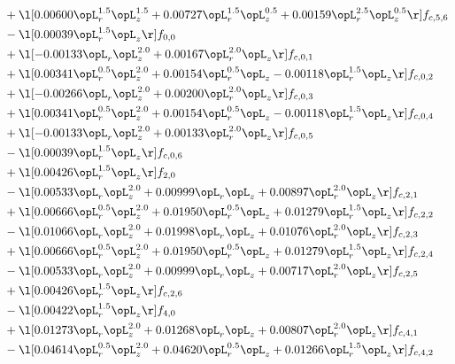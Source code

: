 \begin{alignat}{2}
& + \l[  0.00600 \opL_r^{1.5} \opL_z^{1.5} +  0.00727 \opL_r^{1.5} \opL_z^{0.5} +  0.00159 \opL_r^{2.5} \opL_z^{0.5}  \r] f_{c,5,6} \nonumber \\ 
& - \l[  0.00039 \opL_r^{1.5} \opL_z  \r] f_{0,0} \nonumber \\ 
& + \l[  -0.00133 \opL_r \opL_z^{2.0} +  0.00167 \opL_r^{2.0} \opL_z  \r] f_{c,0,1} \nonumber \\ 
& + \l[  0.00341 \opL_r^{0.5} \opL_z^{2.0} +  0.00154 \opL_r^{0.5} \opL_z   -0.00118 \opL_r^{1.5} \opL_z  \r] f_{c,0,2} \nonumber \\ 
& + \l[  -0.00266 \opL_r \opL_z^{2.0} +  0.00200 \opL_r^{2.0} \opL_z  \r] f_{c,0,3} \nonumber \\ 
& + \l[  0.00341 \opL_r^{0.5} \opL_z^{2.0} +  0.00154 \opL_r^{0.5} \opL_z   -0.00118 \opL_r^{1.5} \opL_z  \r] f_{c,0,4} \nonumber \\ 
& + \l[  -0.00133 \opL_r \opL_z^{2.0} +  0.00133 \opL_r^{2.0} \opL_z  \r] f_{c,0,5} \nonumber \\ 
& - \l[  0.00039 \opL_r^{1.5} \opL_z  \r] f_{c,0,6} \nonumber \\ 
& + \l[  0.00426 \opL_r^{1.5} \opL_z  \r] f_{2,0} \nonumber \\ 
& - \l[  0.00533 \opL_r \opL_z^{2.0} +  0.00999 \opL_r \opL_z +  0.00897 \opL_r^{2.0} \opL_z  \r] f_{c,2,1} \nonumber \\ 
& + \l[  0.00666 \opL_r^{0.5} \opL_z^{2.0} +  0.01950 \opL_r^{0.5} \opL_z +  0.01279 \opL_r^{1.5} \opL_z  \r] f_{c,2,2} \nonumber \\ 
& - \l[  0.01066 \opL_r \opL_z^{2.0} +  0.01998 \opL_r \opL_z +  0.01076 \opL_r^{2.0} \opL_z  \r] f_{c,2,3} \nonumber \\ 
& + \l[  0.00666 \opL_r^{0.5} \opL_z^{2.0} +  0.01950 \opL_r^{0.5} \opL_z +  0.01279 \opL_r^{1.5} \opL_z  \r] f_{c,2,4} \nonumber \\ 
& - \l[  0.00533 \opL_r \opL_z^{2.0} +  0.00999 \opL_r \opL_z +  0.00717 \opL_r^{2.0} \opL_z  \r] f_{c,2,5} \nonumber \\ 
& + \l[  0.00426 \opL_r^{1.5} \opL_z  \r] f_{c,2,6} \nonumber \\ 
& - \l[  0.00422 \opL_r^{1.5} \opL_z  \r] f_{4,0} \nonumber \\ 
& + \l[  0.01273 \opL_r \opL_z^{2.0} +  0.01268 \opL_r \opL_z +  0.00807 \opL_r^{2.0} \opL_z  \r] f_{c,4,1} \nonumber \\ 
& - \l[  0.04614 \opL_r^{0.5} \opL_z^{2.0} +  0.04620 \opL_r^{0.5} \opL_z +  0.01266 \opL_r^{1.5} \opL_z  \r] f_{c,4,2} \nonumber \\ 

\end{alignat}

